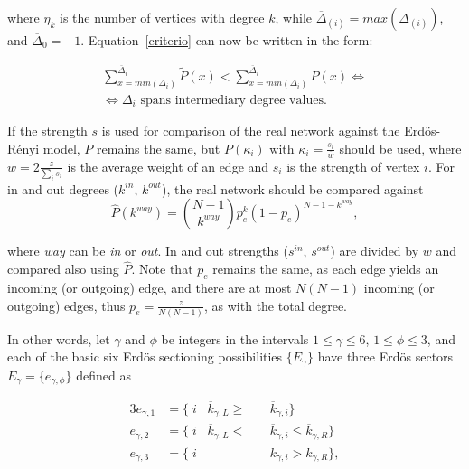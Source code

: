 \noindent where $\eta_k$ is the number of vertices with degree $k$,
while $\overline{\Delta}_{(i)}=max(\Delta_{(i)})$, and $\overline{\Delta}_{0}=-1$.
Equation~\ref{criterio} can now be written in the form:

\begin{equation}\label{criterio2}
\begin{split}
\sum_{x=min(\Delta_i)}^{\overline{\Delta}_i} \widetilde{P}(x) < \sum_{x=min(\Delta_i)}^{\overline{\Delta}_i} P(x) \Leftrightarrow \\
\Leftrightarrow \Delta_i \text{ spans intermediary degree values.}
\end{split}
\end{equation}

If the strength $s$ is used for comparison of the real network against the Erd\"os-R\'enyi model,
$P$ remains the same, but $P(\kappa_i)$ with $\kappa_i=\frac{s_i}{\overline{w}}$ should be used, where $\overline{w}=2\frac{z}{\sum_is_i}$ is the average weight of an edge and $s_i$ is the strength of vertex $i$. For in and out degrees ($k^{in}$, $k^{out}$), the real network should be compared against
\begin{equation}
\hat{P}(k^{way})=\binom{N-1}{k^{way}}p_e^k(1-p_e)^{N-1-k^{way}},
\end{equation}

\noindent where \emph{way} can be \emph{in} or \emph{out}. In and out strengths ($s^{in}$, $s^{out}$) are divided by $\overline{w}$ and compared also using $\hat{P}$. Note that $p_e$ remains the same, as each edge yields an incoming (or outgoing) edge, and there are at most $N(N-1)$ incoming (or outgoing) edges, thus $p_e=\frac{z}{N(N-1)}$, as with the total degree.

In other words, let $\gamma$ and $\phi$ be integers in the intervals $1 \leq \gamma \leq 6$, $1 \leq \phi \leq 3$, and each of the basic six Erd\"os sectioning possibilities $\{E_{\gamma}\}$ have three Erd\"os sectors $E_{\gamma}= \{e_{\gamma, \phi} \}$ defined as

\begin{alignat}{3}\label{eq:part}
e_{\gamma,1}&=\{\;i\;|\;\overline{k}_{\gamma,L}\geq&&\overline{k}_{\gamma,i}\} \nonumber \\
e_{\gamma,2}&=\{\;i\;|\;\overline{k}_{\gamma,L}<\;&&\overline{k}_{\gamma,i}\leq\overline{k}_{\gamma,R}\} \\ 
e_{\gamma,3}&=\{\;i\;|\;&&\overline{k}_{\gamma,i}>\overline{k}_{\gamma,R}\} \nonumber,
\end{alignat}

